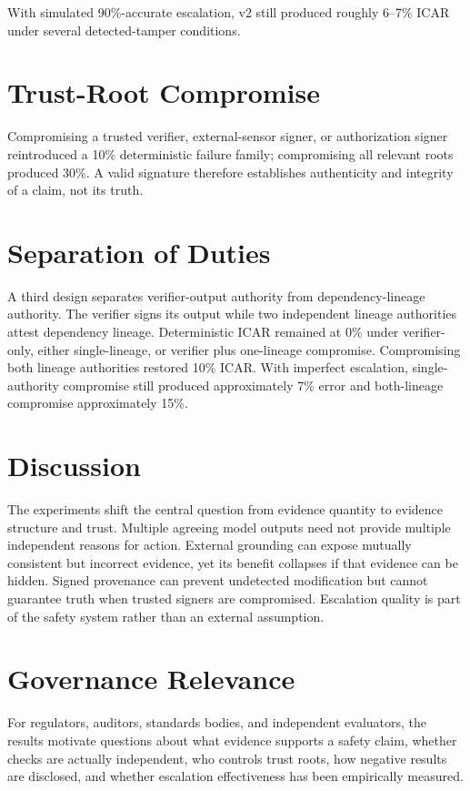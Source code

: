 \documentclass[11pt]{article}
\begin{document}
With simulated 90\%-accurate escalation, v2 still produced roughly 6--7\% ICAR under several detected-tamper conditions.

\section{Trust-Root Compromise}
Compromising a trusted verifier, external-sensor signer, or authorization signer reintroduced a 10\% deterministic failure family; compromising all relevant roots produced 30\%. A valid signature therefore establishes authenticity and integrity of a claim, not its truth.

\section{Separation of Duties}
A third design separates verifier-output authority from dependency-lineage authority. The verifier signs its output while two independent lineage authorities attest dependency lineage. Deterministic ICAR remained at 0\% under verifier-only, either single-lineage, or verifier plus one-lineage compromise. Compromising both lineage authorities restored 10\% ICAR. With imperfect escalation, single-authority compromise still produced approximately 7\% error and both-lineage compromise approximately 15\%.

\section{Discussion}
The experiments shift the central question from evidence quantity to evidence structure and trust. Multiple agreeing model outputs need not provide multiple independent reasons for action. External grounding can expose mutually consistent but incorrect evidence, yet its benefit collapses if that evidence can be hidden. Signed provenance can prevent undetected modification but cannot guarantee truth when trusted signers are compromised. Escalation quality is part of the safety system rather than an external assumption.

\section{Governance Relevance}
For regulators, auditors, standards bodies, and independent evaluators, the results motivate questions about what evidence supports a safety claim, whether checks are actually independent, who controls trust roots, how negative results are disclosed, and whether escalation effectiveness has been empirically measured.
\end{document}
